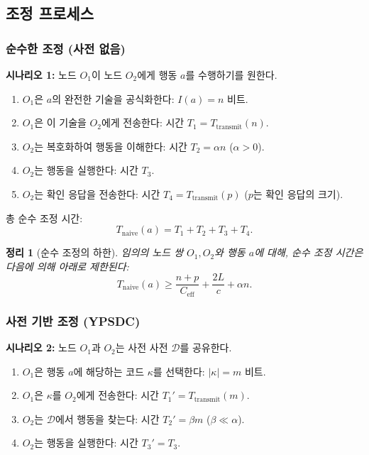 \documentclass[12pt,a4paper]{article}
\newtheorem{theorem}{정리}
\begin{document}
	\subsection{조정 프로세스}
	\label{app:coordination-processes}
	
	\subsubsection{순수한 조정 (사전 없음)}
	
	\textbf{시나리오 1:} 노드 $O_1$이 노드 $O_2$에게 행동 $a$를 수행하기를 원한다.
	
	\begin{enumerate}
		\item $O_1$은 $a$의 완전한 기술을 공식화한다: $I(a) = n$ 비트.
		\item $O_1$은 이 기술을 $O_2$에게 전송한다: 시간 $T_1 = T_{\text{transmit}}(n)$.
		\item $O_2$는 복호화하여 행동을 이해한다: 시간 $T_2 = \alpha n$ ($\alpha > 0$).
		\item $O_2$는 행동을 실행한다: 시간 $T_3$.
		\item $O_2$는 확인 응답을 전송한다: 시간 $T_4 = T_{\text{transmit}}(p)$ ($p$는 확인 응답의 크기).
	\end{enumerate}
	
	총 순수 조정 시간:
	\[
	T_{\text{naive}}(a) = T_1 + T_2 + T_3 + T_4.
	\]
	
	\begin{theorem}[순수 조정의 하한]
		\label{thm:naive-lower-bound}
		임의의 노드 쌍 $O_1, O_2$와 행동 $a$에 대해, 순수 조정 시간은 다음에 의해 아래로 제한된다:
		\[
		T_{\text{naive}}(a) \geq \frac{n + p}{C_{\text{eff}}} + \frac{2L}{c} + \alpha n.
		\]
	\end{theorem}
	
	\subsubsection{사전 기반 조정 (YPSDC)}
	
	\textbf{시나리오 2:} 노드 $O_1$과 $O_2$는 사전 사전 $\mathcal{D}$를 공유한다.
	
	\begin{enumerate}
		\item $O_1$은 행동 $a$에 해당하는 코드 $\kappa$를 선택한다: $|\kappa| = m$ 비트.
		\item $O_1$은 $\kappa$를 $O_2$에게 전송한다: 시간 $T_1' = T_{\text{transmit}}(m)$.
		\item $O_2$는 $\mathcal{D}$에서 행동을 찾는다: 시간 $T_2' = \beta m$ ($\beta \ll \alpha$).
		\item $O_2$는 행동을 실행한다: 시간 $T_3' = T_3$.
	\end{enumerate}
	
\end{document}
